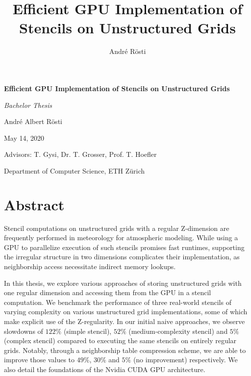 \documentclass[a4paper, 11pt]{book}
\title{Efficient GPU Implementation of Stencils on Unstructured Grids}
\author{André Rösti}
\begin{document}
\begin{titlepage}
		
	\begin{center}
		
		{\Huge \textbf{Efficient GPU Implementation of Stencils on Unstructured Grids}}
		
		\vspace{2cm}
		
		{\Large \textit{Bachelor Thesis}}
		
		\vspace{2cm}
		
		André Albert Rösti
		
		May 14, 2020
		
	\end{center}
		
	\vfill
		
	\raggedleft Advisors: T. Gysi, Dr. T. Grosser, Prof. T. Hoefler
		
	\raggedleft Department of Computer Science, ETH Zürich
		
\end{titlepage}
\thispagestyle{empty}

\tableofcontents

\chapter*{Abstract}

Stencil computations on unstructured grids with a regular Z-dimension are frequently performed in meteorology for atmospheric modeling. While using a GPU to parallelize execution of such stencils promises fast runtimes, supporting the irregular structure in two dimensions complicates their implementation, as neighborship access necessitate indirect memory lookups.

In this thesis, we explore various approaches of storing unstructured grids with one regular dimension and accessing them from the GPU in a stencil computation. We benchmark the performance of three real-world stencils of varying complexity on various unstructured grid implementations, some of which make explicit use of the Z-regularity. In our initial naive approaches, we observe slowdowns of $122\%$ (simple stencil), $52\%$ (medium-complexity stencil) and $5\%$ (complex stencil) compared to executing the same stencils on entirely regular grids. Notably, through a neighborship table compression scheme, we are able to improve those values to $49\%$, $30\%$ and $5\%$ (no improvement) respectively. We also detail the foundations of the Nvidia CUDA GPU architecture.















\printbibliography
\end{document}
